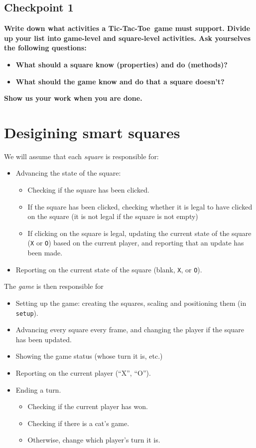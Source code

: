 \documentclass[12pt]{article}
\newcommand{\code}{\texttt}
\newcommand{\ttt}{Tic-Tac-Toe}
\begin{document}
\subsection*{Checkpoint 1}
\vspace*{-1ex}
{\bf
Write down what activities a \ttt\ game must support.
Divide up your list into game-level and square-level activities.
Ask yourselves the following questions:
}
\vspace*{-2ex}
\begin{itemize}
\itemsep -1ex
\item {\bf What should a square know (properties) and do (methods)?}
\item {\bf What should the game know and do that a square doesn't?}
\end{itemize}
{\bf 
Show us your work when you are done.
} 
\clearpage
\section*{Desigining smart squares}

We will assume that each {\em square} is responsible for:
\begin{itemize}
\item Advancing the state of the square:
  \begin{itemize}
  \item Checking if the square has been clicked.
  \item If the square has been clicked,
    checking whether it is legal to have clicked on the square
    (it is not legal if the square is not empty)
  \item If clicking on the square is legal,
    updating the current state of the square (\verb'X' or \verb'O')
    based on the current player,
    and reporting that an update has been made.
  \end{itemize}
\item Reporting on the current state
  of the square (blank, \verb'X', or \verb'O').
\end{itemize}

The {\em game} is then responsible for
\begin{itemize}
\item Setting up the game: creating the squares, scaling and
  positioning them (in \code{setup}).
\item Advancing every square every frame, and changing the player
  if the square has been updated.
\item Showing the game status (whose turn it is, etc.)
\item Reporting on the current player (``X'', ``O'').
\item Ending a turn.
  \begin{itemize}
  \item Checking if the current player has won.
  \item Checking if there is a cat's game.
  \item Otherwise, change which player's turn it is.
  \end{itemize}
\end{itemize}
\end{document}
